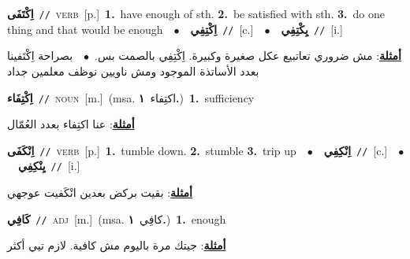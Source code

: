 \documentclass[10pt,a4paper,twoside]{article} %
\begin{document}
\begin{multicols}{2}
{\setlength\topsep{0pt}\textbf{\foreignlanguage{arabic}{اِكْتَفَى}}\ {\color{gray}\texttt{//}\color{black}}\ \textsc{verb}\ [p.]\ \textbf{1.}~have enough of sth.  \textbf{2.}~be satisfied with sth.  \textbf{3.}~do one thing and that would be enough\ \ $\bullet$\ \ \setlength\topsep{0pt}\textbf{\foreignlanguage{arabic}{اِكْتِفِي}}\ {\color{gray}\texttt{//}\color{black}}\ [c.]\ \ $\bullet$\ \ \setlength\topsep{0pt}\textbf{\foreignlanguage{arabic}{يِكْتِفِي}}\ {\color{gray}\texttt{//}\color{black}}\ [i.]\  \begin{flushright}\color{gray}\foreignlanguage{arabic}{\textbf{\underline{\foreignlanguage{arabic}{أمثلة}}}: مش ضروري تعاتبيع عكل صغيرة وكبيرة. اِكْتِفِي بالصمت بس.\ $\bullet$\ \  بصراحة اِكْتَفينا بعدد الأساتذة الموجود ومش ناويين نوظف معلمين جداد}\end{flushright}\color{black}} \vspace{2mm}

{\setlength\topsep{0pt}\textbf{\foreignlanguage{arabic}{اِكْتِفَاء}}\ {\color{gray}\texttt{//}\color{black}}\ \textsc{noun}\ [m.]\ \color{gray}(msa. \foreignlanguage{arabic}{اكتِفاء}~\foreignlanguage{arabic}{\textbf{١.}})\color{black}\ \textbf{1.}~sufficiency\  \begin{flushright}\color{gray}\foreignlanguage{arabic}{\textbf{\underline{\foreignlanguage{arabic}{أمثلة}}}: عنا اكتِفاء بعدد العُمّال}\end{flushright}\color{black}} \vspace{2mm}

{\setlength\topsep{0pt}\textbf{\foreignlanguage{arabic}{اِنْكَفَى}}\ {\color{gray}\texttt{//}\color{black}}\ \textsc{verb}\ [p.]\ \textbf{1.}~tumble down.  \textbf{2.}~stumble  \textbf{3.}~trip up\ \ $\bullet$\ \ \setlength\topsep{0pt}\textbf{\foreignlanguage{arabic}{اِنْكِفِي}}\ {\color{gray}\texttt{//}\color{black}}\ [c.]\ \ $\bullet$\ \ \setlength\topsep{0pt}\textbf{\foreignlanguage{arabic}{يِنْكِفِي}}\ {\color{gray}\texttt{//}\color{black}}\ [i.]\  \begin{flushright}\color{gray}\foreignlanguage{arabic}{\textbf{\underline{\foreignlanguage{arabic}{أمثلة}}}: بقيت بركض بعدين انْكَفيت عوجهي}\end{flushright}\color{black}} \vspace{2mm}

{\setlength\topsep{0pt}\textbf{\foreignlanguage{arabic}{كَافِي}}\ {\color{gray}\texttt{//}\color{black}}\ \textsc{adj}\ [m.]\ \color{gray}(msa. \foreignlanguage{arabic}{كافِي}~\foreignlanguage{arabic}{\textbf{١.}})\color{black}\ \textbf{1.}~enough\  \begin{flushright}\color{gray}\foreignlanguage{arabic}{\textbf{\underline{\foreignlanguage{arabic}{أمثلة}}}: جيتك مرة باليوم مش كافية. لازم تيي أكثر}\end{flushright}\color{black}} \vspace{2mm}


\end{multicols}
\end{document}
